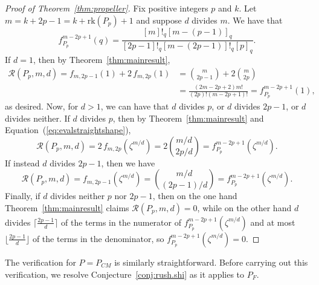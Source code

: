 \documentclass[12pt]{amsart}
\theoremstyle{definition}
\theoremstyle{remark}
\numberwithin{equation}{section}
\newcommand{\rank}{\ensuremath{\mathrm{rk}}}
\begin{document}
\begin{proof}[Proof of Theorem~\ref{thm:propeller}] Fix positive integers $p$ and $k$. Let $m = k+2p-1 = k + \rank(P_p) + 1$ and suppose $d$ divides $m$. We have that \[ f^{m-2p+1}_{P_p}(q) = \frac{[m]!_q [m-(p-1)]_q}{[2p-1]!_q [m-(2p-1)]!_q [p]_q }.\]  If $d = 1$, then by Theorem~\ref{thm:mainresult}, 
\begin{align*}
 \mathcal{R}(P_p,m,d) = f_{m,2p-1}(1) + 2 \, f_{m,2p}(1) &= \binom{m}{2p-1} + 2 \binom{m}{2p} \\
 &= \frac{(2m-2p+2)m!}{(2p)!(m-2p+1)!} = f^{m-2p+1}_{P_p}(1),
 \end{align*}
 as desired.
Now, for $d > 1$, we can have that $d$ divides $p$, or $d$ divides $2p-1$, or $d$ divides neither. If $d$ divides $p$, then by Theorem~\ref{thm:mainresult} and Equation~(\ref{eq:evalstraightshape}),
\[ \mathcal{R}(P_p,m,d) = 2 \, f_{m,2p}(\zeta^{m/d}) = 2\binom{m/d}{2p/d} = f^{m-2p+1}_{P_p}(\zeta^{m/d}).\]
If instead $d$ divides $2p-1$, then we have
\[ \mathcal{R}(P_p,m,d) =  f_{m,2p-1}(\zeta^{m/d}) = \binom{m/d}{(2p-1)/d} = f^{m-2p+1}_{P_p}(\zeta^{m/d}).\]
Finally, if $d$ divides neither $p$ nor $2p-1$, then on the one hand Theorem~\ref{thm:mainresult} claims $\mathcal{R}(P_p,m,d) = 0$, while on the other hand $d$ divides $\lceil{\frac{2p-1}{d}}\rceil$ of the terms in the numerator of $f^{m-2p+1}_{P_p}(\zeta^{m/d})$ and at most $\lfloor{\frac{2p-1}{d}}\rfloor$ of the terms in the denominator, so $f^{m-2p+1}_{P_p}(\zeta^{m/d}) = 0$. 
\end{proof}

The verification for $P = P_{CM}$ is similarly straightforward. Before carrying out this verification, we resolve Conjecture~\ref{conj:rush.shi} as it applies to $P_F$.
\end{document}
